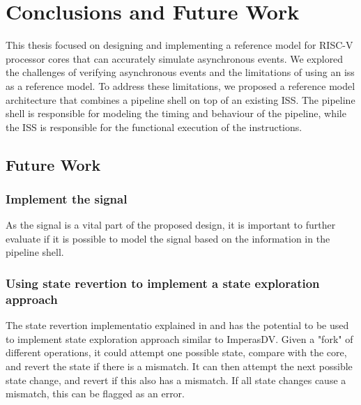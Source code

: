 \chapter{Conclusions and Future Work}
\label{ch:conclusion}



This thesis focused on designing and implementing a reference model for RISC-V processor cores that can accurately simulate asynchronous events. We explored the challenges of verifying asynchronous events and the limitations of using an \acrfull{iss} as a reference model. To address these limitations, we proposed a reference model architecture that combines a pipeline shell on top of an existing ISS. 
The pipeline shell is responsible for modeling the timing and behaviour of the pipeline, while the ISS is responsible for the functional execution of the instructions.




\section{Future Work}

\subsection{Implement the  signal}

As the  signal is a vital part of the proposed design, it is important to further evaluate if it is possible to model the signal based on the information in the pipeline shell.


\subsection{Using state revertion to implement a state exploration approach}

The state revertion implementatio explained in  and  has the potential to be used to implement state exploration approach similar to ImperasDV. Given a "fork" of different operations, it could attempt one possible state, compare with the core, and revert the state if there is a mismatch. It can then attempt the next possible state change, and revert if this also has a mismatch. If all state changes cause a mismatch, this can be flagged as an error.



